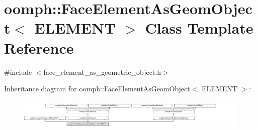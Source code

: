 \hypertarget{classoomph_1_1FaceElementAsGeomObject}{}\section{oomph\+:\+:Face\+Element\+As\+Geom\+Object$<$ E\+L\+E\+M\+E\+NT $>$ Class Template Reference}
\label{classoomph_1_1FaceElementAsGeomObject}


{\ttfamily \#include $<$face\+\_\+element\+\_\+as\+\_\+geometric\+\_\+object.\+h$>$}

Inheritance diagram for oomph\+:\+:Face\+Element\+As\+Geom\+Object$<$ E\+L\+E\+M\+E\+NT $>$\+:\begin{figure}[H]
\begin{center}
\leavevmode
\includegraphics[height=1.483444cm]{classoomph_1_1FaceElementAsGeomObject}
\end{center}
\end{figure}
